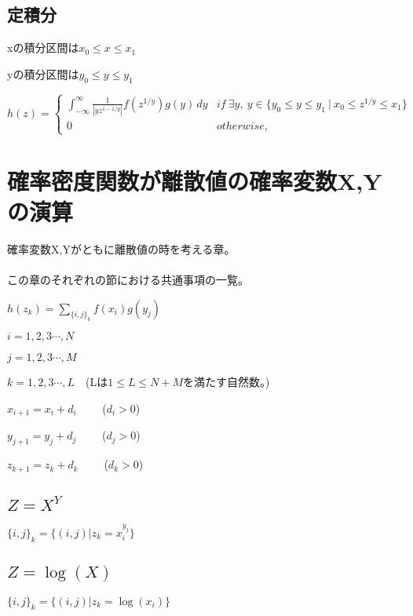 \documentclass[a4paper,11pt]{ltjsarticle}
\begin{document}
\subsection{定積分}
\begin{description}
    \item xの積分区間は$x_0 \leq x \leq x_1$
    \item yの積分区間は$y_0 \leq y \leq y_1$
\end{description}
$$
    h(z)=
    \begin{cases}
        \int_{-\infty}^{\infty} \frac{1}{|yz^{1-1/y}|} f(z^{1/y}) g(y) \, dy    & if\ \exists y,\  y\in \{ y_0 \leq y \leq y_1 \ | \ x_0 \leq z^{1/y} \leq x_1 \}\\
        0                                                                       & otherwise,
    \end{cases}
$$
\newpage


\section{確率密度関数が離散値の確率変数X,Yの演算}
確率変数X,Yがともに離散値の時を考える章。\\
\\

この章のそれぞれの節における共通事項の一覧。
\begin{description}
    \item $h(z_k) = \sum_{\{ i,j \}_k} f(x_i)g(y_j)$
    \item $i=1,2,3\cdots,N$
    \item $j=1,2,3\cdots,M$
    \item $k=1,2,3\cdots,L$\ \ (Lは$1\leq L \leq N+M$を満たす自然数。)
    \item $x_{i+1}=x_i+d_i$ \ \ \ \ ($d_i>0$)
    \item $y_{j+1}=y_j+d_j$ \ \ \ \ ($d_j>0$)
    \item $z_{k+1}=z_k+d_k$ \ \ \ \ ($d_k>0$)
\end{description}

\subsection{$Z=X^Y$}
$\{ i,j \}_k = \{ (i,j) | z_k = x_i^{y_j} \}$

\subsection{$Z=\log(X)$}
$\{ i,j \}_k = \{ (i,j) | z_k = \log(x_i) \}$
\end{document}
